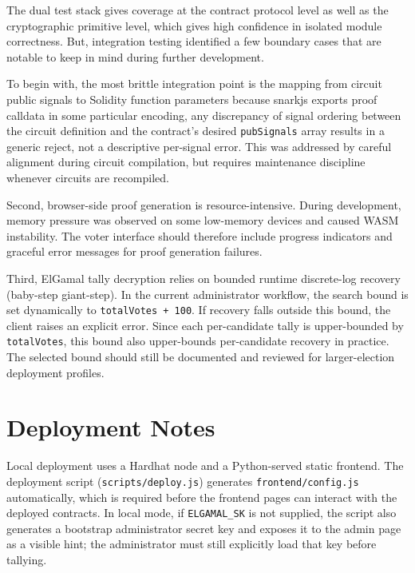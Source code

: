 The dual test stack gives coverage at the contract protocol level as well as the cryptographic primitive level, which gives high confidence in isolated module correctness. But, integration testing identified a few boundary cases that are notable to keep in mind during further development.

To begin with, the most brittle integration point is the mapping from circuit public signals to Solidity function parameters because snarkjs exports proof calldata in some particular encoding, any discrepancy of signal ordering between the circuit definition and the contract's desired \texttt{pubSignals} array results in a generic reject, not a descriptive per-signal error. This was addressed by careful alignment during circuit compilation, but requires maintenance discipline whenever circuits are recompiled.

Second, browser-side proof generation is resource-intensive. During development, memory pressure was observed on some low-memory devices and caused WASM instability. The voter interface should therefore include progress indicators and graceful error messages for proof generation failures.

Third, ElGamal tally decryption relies on bounded runtime discrete-log recovery (baby-step giant-step). In the current administrator workflow, the search bound is set dynamically to \texttt{totalVotes + 100}. If recovery falls outside this bound, the client raises an explicit error. Since each per-candidate tally is upper-bounded by \texttt{totalVotes}, this bound also upper-bounds per-candidate recovery in practice. The selected bound should still be documented and reviewed for larger-election deployment profiles.

\section{Deployment Notes}

Local deployment uses a Hardhat node and a Python-served static frontend. The deployment script (\texttt{scripts/deploy.js}) generates \texttt{frontend/config.js} automatically, which is required before the frontend pages can interact with the deployed contracts. In local mode, if \texttt{ELGAMAL\_SK} is not supplied, the script also generates a bootstrap administrator secret key and exposes it to the admin page as a visible hint; the administrator must still explicitly load that key before tallying.

